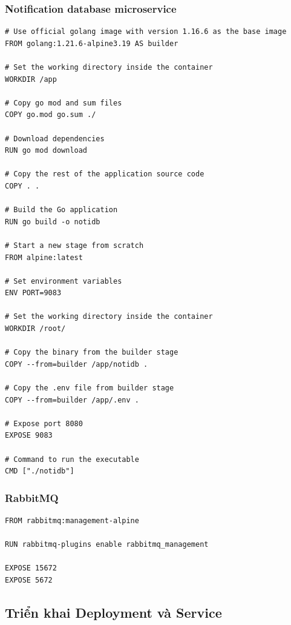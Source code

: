 \subsubsection*{Notification database microservice}
\begin{lstlisting}[language=docker]
# Use official golang image with version 1.16.6 as the base image
FROM golang:1.21.6-alpine3.19 AS builder

# Set the working directory inside the container
WORKDIR /app

# Copy go mod and sum files
COPY go.mod go.sum ./

# Download dependencies
RUN go mod download

# Copy the rest of the application source code
COPY . .

# Build the Go application
RUN go build -o notidb

# Start a new stage from scratch
FROM alpine:latest  

# Set environment variables
ENV PORT=9083

# Set the working directory inside the container
WORKDIR /root/

# Copy the binary from the builder stage
COPY --from=builder /app/notidb .

# Copy the .env file from builder stage
COPY --from=builder /app/.env .

# Expose port 8080
EXPOSE 9083

# Command to run the executable
CMD ["./notidb"]
\end{lstlisting}

\subsubsection*{RabbitMQ}
\begin{lstlisting}[language=docker]
FROM rabbitmq:management-alpine

RUN rabbitmq-plugins enable rabbitmq_management

EXPOSE 15672
EXPOSE 5672
\end{lstlisting}
\subsection{Triển khai Deployment và Service}
